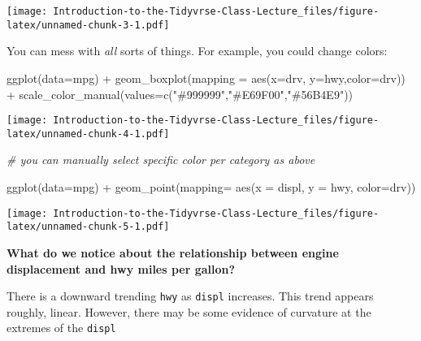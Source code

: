 \documentclass[
]{article}
\newenvironment{Shaded}{\begin{snugshade}}{\end{snugshade}}
\newcommand{\AttributeTok}[1]{\textcolor[rgb]{0.77,0.63,0.00}{#1}}
\newcommand{\CommentTok}[1]{\textcolor[rgb]{0.56,0.35,0.01}{\textit{#1}}}
\newcommand{\FunctionTok}[1]{\textcolor[rgb]{0.00,0.00,0.00}{#1}}
\newcommand{\NormalTok}[1]{#1}
\newcommand{\SpecialCharTok}[1]{\textcolor[rgb]{0.00,0.00,0.00}{#1}}
\newcommand{\StringTok}[1]{\textcolor[rgb]{0.31,0.60,0.02}{#1}}
\begin{document}
\texttt{[image: Introduction-to-the-Tidyvrse-Class-Lecture\_files/figure-latex/unnamed-chunk-3-1.pdf]}

You can mess with \emph{all} sorts of things. For example, you could
change colors:

\begin{Shaded}
\begin{Highlighting}[]
\FunctionTok{ggplot}\NormalTok{(}\AttributeTok{data=}\NormalTok{mpg) }\SpecialCharTok{+} \FunctionTok{geom\_boxplot}\NormalTok{(}\AttributeTok{mapping =} \FunctionTok{aes}\NormalTok{(}\AttributeTok{x=}\NormalTok{drv, }\AttributeTok{y=}\NormalTok{hwy,}\AttributeTok{color=}\NormalTok{drv)) }\SpecialCharTok{+} \FunctionTok{scale\_color\_manual}\NormalTok{(}\AttributeTok{values=}\FunctionTok{c}\NormalTok{(}\StringTok{"\#999999"}\NormalTok{,}\StringTok{"\#E69F00"}\NormalTok{,}\StringTok{"\#56B4E9"}\NormalTok{))   }
\end{Highlighting}
\end{Shaded}

\texttt{[image: Introduction-to-the-Tidyvrse-Class-Lecture\_files/figure-latex/unnamed-chunk-4-1.pdf]}

\begin{Shaded}
\begin{Highlighting}[]
\CommentTok{\# you can manually select specific color per category as above}
\end{Highlighting}
\end{Shaded}

\begin{Shaded}
\begin{Highlighting}[]
\FunctionTok{ggplot}\NormalTok{(}\AttributeTok{data=}\NormalTok{mpg) }\SpecialCharTok{+} 
  \FunctionTok{geom\_point}\NormalTok{(}\AttributeTok{mapping=} \FunctionTok{aes}\NormalTok{(}\AttributeTok{x =}\NormalTok{ displ, }\AttributeTok{y =}\NormalTok{ hwy, }\AttributeTok{color=}\NormalTok{drv))}
\end{Highlighting}
\end{Shaded}

\texttt{[image: Introduction-to-the-Tidyvrse-Class-Lecture\_files/figure-latex/unnamed-chunk-5-1.pdf]}

\textbf{What do we notice about the relationship between engine
displacement and hwy miles per gallon?}

There is a downward trending \texttt{hwy} as \texttt{displ} increases.
This trend appears roughly, linear. However, there may be some evidence
of curvature at the extremes of the \texttt{displ}
\end{document}
